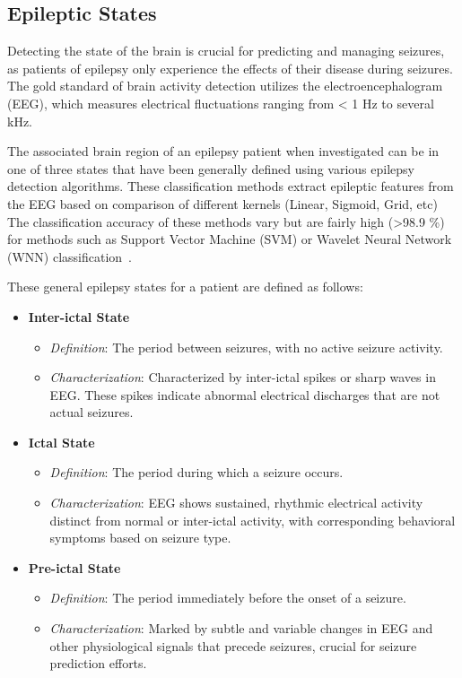 \subsection{Epileptic States}
Detecting the state of the brain is crucial for predicting and managing seizures, as patients of epilepsy
only experience the effects of their disease during seizures.
The gold standard of brain activity detection utilizes the electroencephalogram (EEG), 
which measures electrical fluctuations ranging from < 1 Hz to several kHz.

The associated brain region of an epilepsy patient when investigated can be in one of three states that have been generally defined using 
various epilepsy detection algorithms. These classification methods extract epileptic features from the EEG based on comparison of 
different kernels (Linear, Sigmoid, Grid, etc) The classification accuracy of these methods vary but are fairly high (>98.9 \%) for methods such as
Support Vector Machine (SVM) or Wavelet Neural Network (WNN) classification~\parencite{yayikEpilepticStateDetection2015}.
\pagebreak

These general epilepsy states for a patient are defined as follows:
\begin{itemize}
    \item \textbf{Inter-ictal State}
    \begin{itemize}
        \item \textit{Definition}: The period between seizures, with no active seizure activity.
        \item \textit{Characterization}: Characterized by inter-ictal spikes or sharp waves in EEG\@.
        These spikes indicate abnormal electrical discharges that are not actual seizures.
    \end{itemize}
    \item \textbf{Ictal State}
    \begin{itemize}
        \item \textit{Definition}: The period during which a seizure occurs.
        \item \textit{Characterization}: EEG shows sustained, rhythmic electrical activity distinct from normal or inter-ictal activity, 
        with corresponding behavioral symptoms based on seizure type.
    \end{itemize}
    \item \textbf{Pre-ictal State}
    \begin{itemize}
        \item \textit{Definition}: The period immediately before the onset of a seizure.
        \item \textit{Characterization}: Marked by subtle and variable changes in EEG and other physiological signals that precede seizures, 
        crucial for seizure prediction efforts.
    \end{itemize}
\end{itemize}

